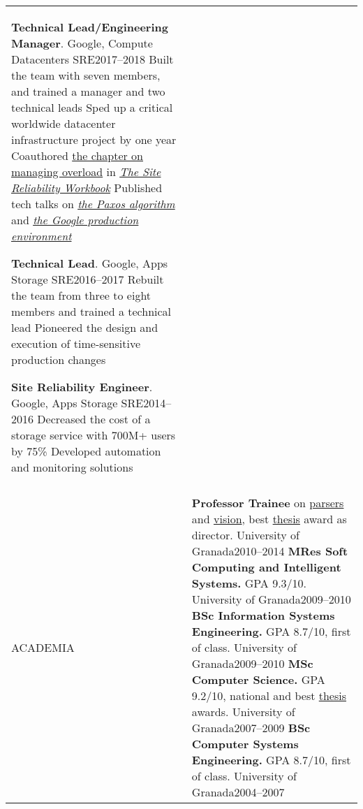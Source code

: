\documentclass[letterpaper,10pt,oneside]{article}
\newcommand{\DatestampY}[1]{#1}
\newenvironment{body}
{\par\par
\begin{longtable}{p{0.125\textwidth}p{0.84\textwidth}}}
{\par\end{longtable}\par}
\renewcommand{\section}[3]{\\[-0.7cm]\pdfbookmark[2]{#2}{#3}\\%
\raggedleft  %
{\fontsize{9.5pt}{9.5pt}\selectfont\bfseries\raggedright%
\MakeUppercase{#1}}&}
\newcommand{\SmallEntryGap}{\par\vspace{0.38em}\par}
\begin{document}
\begin{body}
\textbf{Technical Lead/Engineering Manager}. Google, Compute Datacenters SRE\hfill \DatestampY{2017}--\DatestampY{2018} \newline
\phantom{w}Built the team with seven members, and trained a manager and two technical leads\newline
\phantom{w}Sped up a critical worldwide datacenter infrastructure project by one year\newline
\phantom{w}Coauthored \href{https://landing.google.com/sre/workbook/chapters/overload/}{the chapter on managing overload} in \textit{\href{https://landing.google.com/sre/books/}{The Site Reliability Workbook}}\newline
\phantom{w}Published tech talks on \textit{\href{https://youtu.be/d7nAGI_NZPk}{the Paxos algorithm}} and \textit{\href{https://youtu.be/dhTVVWzpc4Q}{the Google production environment}}

\SmallEntryGap

\textbf{Technical Lead}. Google, Apps Storage SRE\hfill \DatestampY{2016}--\DatestampY{2017}\newline
\phantom{w}Rebuilt the team from three to eight members and trained a technical lead\newline
\phantom{w}Pioneered the design and execution of time-sensitive production changes

\SmallEntryGap

\textbf{Site Reliability Engineer}. Google, Apps Storage SRE\hfill \DatestampY{2014}--\DatestampY{2016}\newline
\phantom{w}Decreased the cost of a storage service with 700M+ users by 75\%\newline
\phantom{w}Developed automation and monitoring solutions


\section{Academia}{Academia}{PDF:Academia}

\textbf{Professor Trainee} on \href{https://github.com/lquesada/ModelCC}{parsers} and \href{https://github.com/lquesada/MotionTracking}{vision}, best \href{https://github.com/lquesada/ADAgio}{thesis} award as director. University of Granada\hfill \DatestampY{2010}--\DatestampY{2014} \newline
\textbf{MRes Soft Computing and Intelligent Systems.} GPA 9.3/10. University of Granada\hfill \DatestampY{2009}--\DatestampY{2010} \newline
\textbf{BSc Information Systems Engineering.} GPA 8.7/10, first of class. University of Granada\hfill \DatestampY{2009}--\DatestampY{2010} \newline
\textbf{MSc Computer Science.} GPA 9.2/10, national and best \href{https://github.com/lquesada/JSimil}{thesis} awards. University of Granada\hfill \DatestampY{2007}--\DatestampY{2009} \newline
\textbf{BSc Computer Systems Engineering.} GPA 8.7/10, first of class. University of Granada\hfill \DatestampY{2004}--\DatestampY{2007}


\end{body}
\end{document}
